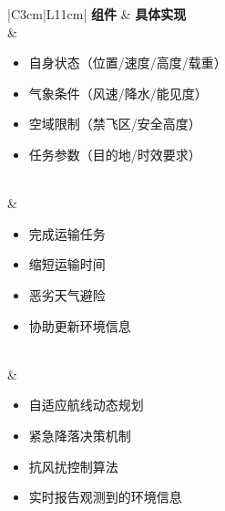 \documentclass[12pt,a4paper]{article}
\begin{document}
\begin{table}[h]
	\centering
	\caption{无人机BDI模型}
	\label{tab:uav-bdi}
	\begin{tabular}{|C{3cm}|L{11cm}|}
		\hline
		\textbf{组件} & \textbf{具体实现} \\
		\hline
		 & 
		\begin{minipage}[t]{\linewidth}
			\begin{itemize}[leftmargin=*, nosep, topsep=0pt, itemsep=3pt]
				\item 自身状态（位置/速度/高度/载重）
				\item 气象条件（风速/降水/能见度）
				\item 空域限制（禁飞区/安全高度）
				\item 任务参数（目的地/时效要求）
			\end{itemize}
		\end{minipage} \\
		\hline
		 & 
		\begin{minipage}[t]{\linewidth}
			\begin{itemize}[leftmargin=*, nosep, topsep=0pt, itemsep=3pt]
				\item 完成运输任务
				\item 缩短运输时间
				\item 恶劣天气避险
				\item 协助更新环境信息
			\end{itemize}
		\end{minipage} \\
		\hline
		 & 
		\begin{minipage}[t]{\linewidth}
			\begin{itemize}[leftmargin=*, nosep, topsep=0pt, itemsep=3pt]
				\item 自适应航线动态规划
				\item 紧急降落决策机制
				\item 抗风扰控制算法
				\item 实时报告观测到的环境信息
			\end{itemize}
		\end{minipage} \\
		\hline
	\end{tabular}
\end{table}
\FloatBarrier
\end{document}
